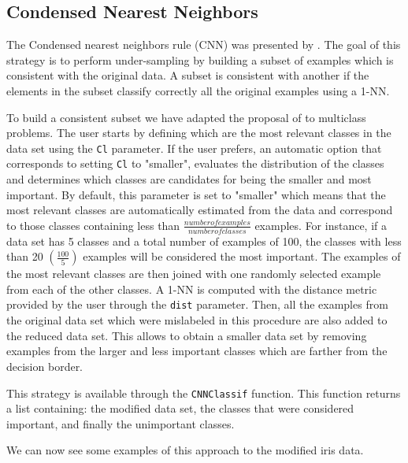 \documentclass[10pt,a4paper]{article}\usepackage[]{graphicx}\usepackage[]{color}
\begin{document}
\subsection{Condensed Nearest Neighbors}\label{sec:CNN}

The Condensed nearest neighbors rule (CNN) was presented by \cite{cnn}. The goal of this strategy is to perform under-sampling by building a subset of examples which is consistent with the original data. A subset is consistent with another if the elements in the subset classify correctly all the original examples using a 1-NN. 

To build a consistent subset we have adapted the proposal of \cite{KM97} to multiclass problems. The user starts by defining which are the most relevant classes in the data set using the \texttt{Cl} parameter. If the user prefers, an automatic option that corresponds to setting \texttt{Cl} to "smaller", evaluates the distribution of the classes and determines which classes are candidates for being the smaller and most important. By default, this parameter is set to "smaller" which means that the most relevant classes are automatically estimated from the data and correspond to those classes containing less than $\frac{number of examples}{number of classes}$ examples. For instance, if a data set has 5 classes and a total number of examples of 100, the classes with less than 20 $(\frac{100}{5})$ examples will be considered the most important. The examples of the most relevant classes are then joined with one randomly selected example from each of the other classes. A 1-NN is computed with the distance metric provided by the user through the \texttt{dist} parameter. Then, all the examples from the original data set which were mislabeled in this procedure are also added to the reduced data set. This allows to obtain a smaller data set by removing examples from the larger and less important classes which are farther from the decision border.

This strategy is available through the \texttt{CNNClassif} function. This function returns a list containing: the modified data set, the classes that were considered important, and finally the unimportant classes.


We can now see some examples of this approach to the modified iris data.
\end{document}
